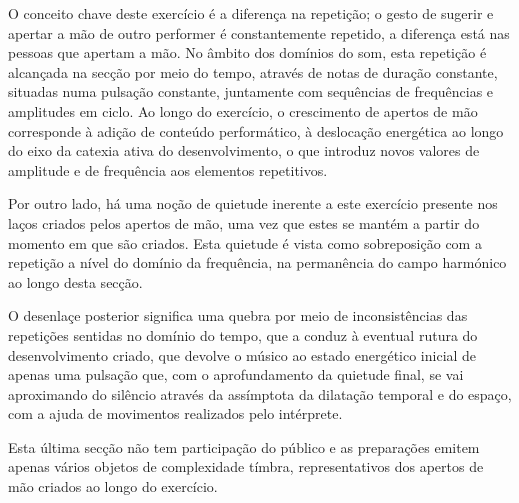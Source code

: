 \documentclass[../main.tex]{subfiles}
\begin{document}
O conceito chave deste exercício é a diferença na repetição; o gesto de sugerir e apertar a mão de outro performer é constantemente repetido, a diferença está nas pessoas que apertam a mão. No âmbito dos domínios do som, esta repetição é alcançada na secção por meio do tempo, através de notas de duração constante, situadas numa pulsação constante, juntamente com sequências de frequências e amplitudes em ciclo. Ao longo do exercício, o crescimento de apertos de mão corresponde à adição de conteúdo performático, à deslocação energética ao longo do eixo da catexia ativa do desenvolvimento, o que introduz novos valores de amplitude e de frequência aos elementos repetitivos.

Por outro lado, há uma noção de quietude inerente a este exercício presente nos laços criados pelos apertos de mão, uma vez que estes se mantém a partir do momento em que são criados. Esta quietude é vista como sobreposição com a repetição a nível do domínio da frequência, na permanência do campo harmónico ao longo desta secção.

O desenlaçe posterior significa uma quebra por meio de inconsistências das repetições sentidas no domínio do tempo, que a conduz à eventual rutura do desenvolvimento criado, que devolve o músico ao estado energético inicial de apenas uma pulsação que, com o aprofundamento da quietude final, se vai aproximando do silêncio através da assímptota da dilatação temporal e do espaço, com a ajuda de movimentos realizados pelo intérprete.

Esta última secção não tem participação do público e as preparações emitem apenas vários objetos de complexidade tímbra, representativos dos apertos de mão criados ao longo do exercício.
\end{document}
